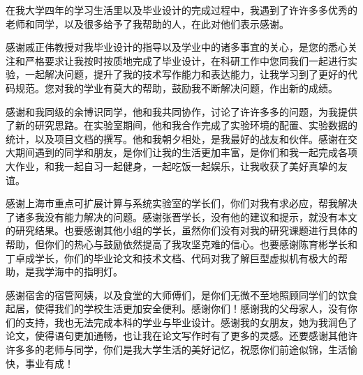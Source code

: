 \begin{thanks}
在我大学四年的学习生活里以及毕业设计的完成过程中，我遇到了许许多多优秀的老师和同学，以及很多给予了我帮助的人，在此对他们表示感谢。

感谢戚正伟教授对我毕业设计的指导以及学业中的诸多事宜的关心，是您的悉心关注和严格要求让我按时按质地完成了毕业设计，在科研工作中您同我们一起进行实验，一起解决问题，提升了我的技术写作能力和表达能力，让我学习到了更好的代码规范。您对我的学业有莫大的帮助，鼓励我不断解决问题，作出新的成绩。

感谢和我同级的余博识同学，他和我共同协作，讨论了许许多多的问题，为我提供了新的研究思路。在实验室期间，他和我合作完成了实验环境的配置、实验数据的统计，以及项目文档的撰写。他和我朝夕相处，是我最好的战友和伙伴。感谢在交大期间遇到的同学和朋友，是你们让我的生活更加丰富，是你们和我一起完成各项大作业，和我一起自习一起健身，一起吃饭一起娱乐，让我收获了美好真挚的友谊。

感谢上海市重点可扩展计算与系统实验室的学长们，你们对我有求必应，帮我解决了诸多我没有能力解决的问题。感谢张晋学长，没有他的建议和提示，就没有本文的研究结果。也要感谢其他小组的学长，虽然你们没有对我的研究课题进行具体的帮助，但你们的热心与鼓励依然提高了我攻坚克难的信心。也要感谢陈育彬学长和丁卓成学长，你们的毕业论文和技术文档、代码对我了解巨型虚拟机有极大的帮助，是我学海中的指明灯。

感谢宿舍的宿管阿姨，以及食堂的大师傅们，是你们无微不至地照顾同学们的饮食起居，使得我们的学校生活更加安全便利。感谢你们！感谢我的父母家人，没有你们的支持，我也无法完成本科的学业与毕业设计。感谢我的女朋友，她为我润色了论文，使得语句更加通畅，也让我在论文写作时有了更多的灵感。还要感谢其他许许多多的老师与同学，你们是我大学生活的美好记忆，祝愿你们前途似锦，生活愉快，事业有成！

  

\end{thanks}
